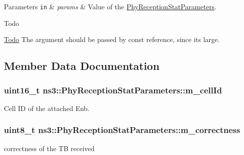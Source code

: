 \begin{DoxyParams}[1]{Parameters}
\mbox{\tt in}  & {\em params} & Value of the \hyperlink{structns3_1_1PhyReceptionStatParameters}{Phy\+Reception\+Stat\+Parameters}. \\
\hline
\end{DoxyParams}
\begin{DoxyRefDesc}{Todo}
\item[\hyperlink{todo__todo000083}{Todo}]The argument should be passed by const reference, since it\textquotesingle{}s large. \end{DoxyRefDesc}


\subsection{Member Data Documentation}
\subsubsection[{\texorpdfstring{m\+\_\+cell\+Id}{m_cellId}}]{\setlength{\rightskip}{0pt plus 5cm}uint16\+\_\+t ns3\+::\+Phy\+Reception\+Stat\+Parameters\+::m\+\_\+cell\+Id}\hypertarget{structns3_1_1PhyReceptionStatParameters_a9c2552630406c7f857440ec75905016e}{}\label{structns3_1_1PhyReceptionStatParameters_a9c2552630406c7f857440ec75905016e}


Cell ID of the attached Enb. 

\subsubsection[{\texorpdfstring{m\+\_\+correctness}{m_correctness}}]{\setlength{\rightskip}{0pt plus 5cm}uint8\+\_\+t ns3\+::\+Phy\+Reception\+Stat\+Parameters\+::m\+\_\+correctness}\hypertarget{structns3_1_1PhyReceptionStatParameters_a6657e7b9e0a31e63570a91a25e5ef0a1}{}\label{structns3_1_1PhyReceptionStatParameters_a6657e7b9e0a31e63570a91a25e5ef0a1}


correctness of the TB received 

